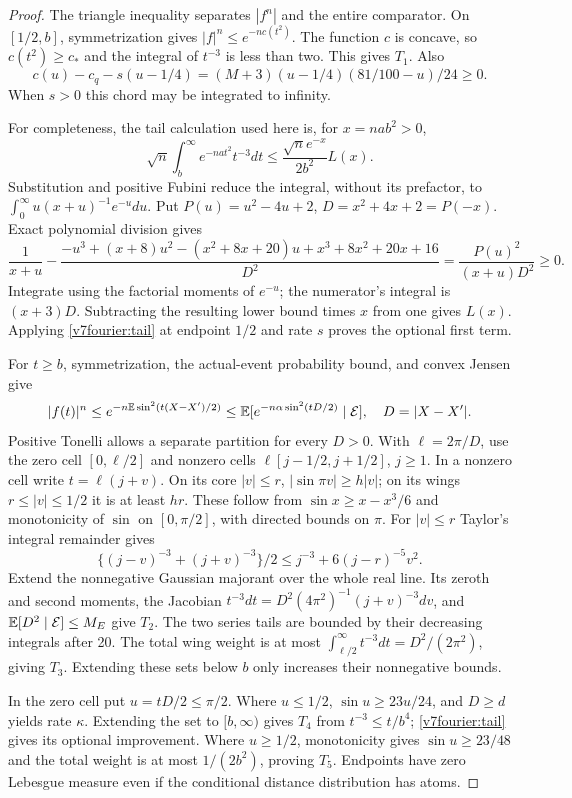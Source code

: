 \begin{proof}
The triangle inequality separates $|f^n|$ and the entire comparator.
On $[1/2,b]$, symmetrization gives $|f|^n\le e^{-nc(t^2)}$.
The function $c$ is concave, so $c(t^2)\ge c_*$ and the integral
of $t^{-3}$ is less than two. This gives $T_1$.
Also
\[
 c(u)-c_q-s(u-1/4)=(M+3)(u-1/4)(81/100-u)/24\ge0.
\]
When $s>0$ this chord may be integrated to infinity.

For completeness, the tail calculation used here is, for $x=na b^2>0$,
\begin{equation}\label{v7fourier:tail}
 \sqrt n\int_b^\infty e^{-na t^2}t^{-3}dt
 \le\frac{\sqrt n e^{-x}}{2b^2}L(x).
\end{equation}
Substitution and positive Fubini reduce the integral, without its
prefactor, to $\int_0^\infty u(x+u)^{-1}e^{-u}du$. Put
$P(u)=u^2-4u+2$, $D=x^2+4x+2=P(-x)$. Exact polynomial division gives
\[
 \frac1{x+u}-\frac{-u^3+(x+8)u^2-(x^2+8x+20)u+x^3+8x^2+20x+16}{D^2}
 =\frac{P(u)^2}{(x+u)D^2}\ge0.
\]
Integrate using the factorial moments of $e^{-u}$; the numerator's
integral is $(x+3)D$. Subtracting the resulting lower bound times $x$
from one gives $L(x)$. Applying \eqref{v7fourier:tail} at endpoint
$1/2$ and rate $s$ proves the optional first term.

For $t\ge b$, symmetrization, the actual-event probability bound,
and convex Jensen give
\[
 |f(t)|^n\le e^{-n\mathbb E\sin^2(t(X-X')/2)}
 \le\mathbb E[e^{-n\alpha\sin^2(tD/2)}\mid\mathcal E],
 \quad D=|X-X'|.
\]
Positive Tonelli allows a separate partition for every $D>0$.
With $\ell=2\pi/D$, use the zero cell $[0,\ell/2]$ and nonzero
cells $\ell[j-1/2,j+1/2]$, $j\ge1$. In a nonzero cell write
$t=\ell(j+v)$. On its core $|v|\le r$,
$|\sin\pi v|\ge h|v|$; on its wings $r\le|v|\le1/2$ it is
at least $hr$. These follow from $\sin x\ge x-x^3/6$ and
monotonicity of $\sin$ on $[0,\pi/2]$, with directed bounds on $\pi$.
For $|v|\le r$ Taylor's integral remainder gives
\[
 \{(j-v)^{-3}+(j+v)^{-3}\}/2
 \le j^{-3}+6(j-r)^{-5}v^2.
\]
Extend the nonnegative Gaussian majorant over the whole real line.
Its zeroth and second moments, the Jacobian
$t^{-3}dt=D^2(4\pi^2)^{-1}(j+v)^{-3}dv$, and
$\mathbb E[D^2\mid\mathcal E]\le M_E$ give $T_2$.
The two series tails are bounded by their decreasing integrals after
20. The total wing weight is at most
$\int_{\ell/2}^\infty t^{-3}dt=D^2/(2\pi^2)$, giving $T_3$.
Extending these sets below $b$ only increases their nonnegative bounds.

In the zero cell put $u=tD/2\le\pi/2$. Where $u\le1/2$,
$\sin u\ge23u/24$, and $D\ge d$ yields rate $\kappa$.
Extending the set to $[b,\infty)$ gives $T_4$ from
$t^{-3}\le t/b^4$; \eqref{v7fourier:tail} gives its optional improvement.
Where $u\ge1/2$, monotonicity gives $\sin u\ge23/48$ and the total
weight is at most $1/(2b^2)$, proving $T_5$. Endpoints have zero
Lebesgue measure even if the conditional distance distribution has atoms.


\end{proof}

